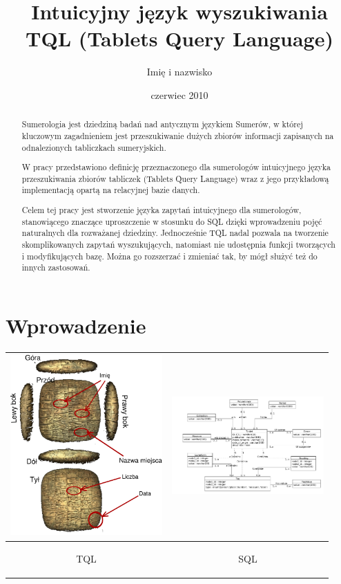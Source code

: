 \documentclass{pracamgr}
\author{Imię i nazwisko}
\title{Intuicyjny język wyszukiwania TQL (Tablets Query Language)}
\date{czerwiec 2010}
\begin{document}
\maketitle

\begin{abstract}
Sumerologia jest dziedziną badań nad antycznym językiem Sumerów, w której
kluczowym zagadnieniem jest przeszukiwanie dużych zbiorów informacji
zapisanych na odnalezionych tabliczkach sumeryjskich.

W pracy przedstawiono definicję przeznaczonego dla sumerologów intuicyjnego
języka przeszukiwania zbiorów tabliczek (Tablets Query Language) wraz z jego
przykładową implementacją opartą na relacyjnej bazie danych.

Celem tej pracy jest stworzenie języka zapytań intuicyjnego dla sumerologów,
stanowiącego znaczące uproszczenie w stosunku do SQL dzięki wprowadzeniu pojęć 
naturalnych dla rozważanej dziedziny. Jednocześnie TQL nadal
pozwala na tworzenie skomplikowanych zapytań wyszukujących, natomiast nie 
udostępnia funkcji tworzących i modyfikujących bazę. Można go rozszerzać 
i zmieniać tak, by mógł służyć też do innych zastosowań.
\end{abstract}

\tableofcontents

\chapter*{Wprowadzenie}
\begin{tabular}{|c|c|}
\hline
 \includegraphics[width=220px]{./diagramy/tabliczka.pdf}
 & 
 \includegraphics[width=220px]{./diagramy/diagram-encji-maly.pdf}\\
\hline
\begin{Huge}TQL\end{Huge} & \begin{Huge}SQL\end{Huge} \\
\hline 
\end{tabular} 
\end{document}
